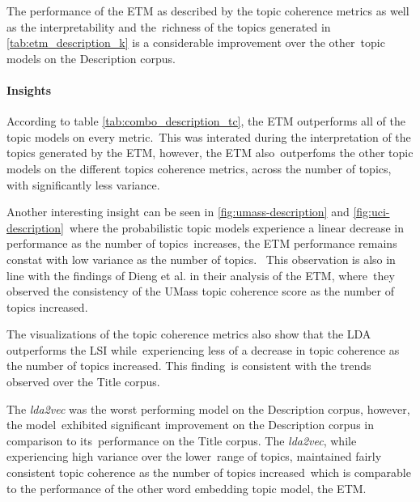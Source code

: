 \documentclass[letterpaper,12pt]{article}
\begin{document}
The performance of the ETM as described by the topic coherence metrics as well as the interpretability and the\
richness of the topics generated in \ref{tab:etm_description_k} is a considerable improvement over the other\
topic models on the Description corpus.

\newpage

\paragraph{Insights}
According to table \ref{tab:combo_description_tc}, the ETM outperforms all of the topic models on every metric.\
This was interated during the interpretation of the topics generated by the ETM, however, the ETM also\
outperfoms the other topic models on the different topics coherence metrics, across the number of topics,
with significantly less variance.

Another interesting insight can be seen in \ref{fig:umass-description} and \ref{fig:uci-description}\
where the probabilistic topic models experience a linear decrease in performance as the number of topics\
increases, the ETM performance remains constat with low variance as the number of topics. \
This observation is also in line with the findings of Dieng et al. in their analysis of the ETM, where\
they observed the consistency of the UMass topic coherence score as the number of topics increased.

The visualizations of the topic coherence metrics also show that the LDA outperforms the LSI while\
experiencing less of a decrease in topic coherence as the number of topics increased. This finding\
is consistent with the trends observed over the Title corpus.

The \emph{lda2vec} was the worst performing model on the Description corpus, however, the model\
exhibited significant improvement on the Description corpus in comparison to its\
performance on the Title corpus. The \emph{lda2vec}, while experiencing high variance over the lower\
range of topics, maintained fairly consistent topic coherence as the number of topics increased\
which is comparable to the performance of the other word embedding topic model, the ETM.
\end{document}
